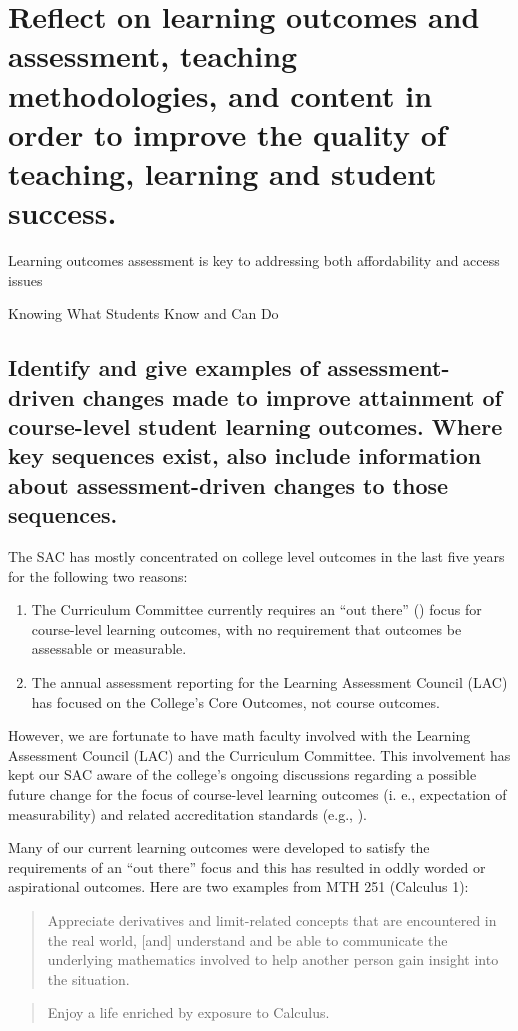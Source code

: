 \chapter[Outcomes and Assessment]{Reflect on learning outcomes and assessment,
  teaching methodologies, and content in order to improve the quality of teaching,
  learning and student success.}\label{chap:outcomes}
\epigraph{Learning outcomes assessment is key to addressing both affordability and access issues}
{Knowing What Students Know and Can Do \cite{outcomesquote}}

\section[Course-level outcomes]{Identify and give examples of assessment-driven
  changes made to improve attainment of course-level student learning outcomes.
  Where key sequences exist, also include information about assessment-driven changes to those sequences.
 }

The SAC has mostly concentrated on college level outcomes in the last five years for the following two reasons: \begin{enumerate} \item The Curriculum Committee currently requires an ``out there'' (\cite{courseoutcomes}) focus for course-level learning outcomes, with no requirement that outcomes be assessable or measurable.
	\item The annual assessment reporting for the Learning Assessment Council (LAC)
	      has focused on the College's Core Outcomes, not course outcomes.
\end{enumerate}

However, we are fortunate to have math faculty involved with the Learning Assessment Council (LAC) and the Curriculum Committee.
This involvement has kept our SAC aware of the college's ongoing discussions regarding a possible future change for the focus of course-level learning outcomes  (i.
e., expectation of
measurability) and related accreditation standards (e.g., \cite[Standard
	4.
	A.
	3]{NWCCU}).

Many of our current learning outcomes were developed to satisfy the requirements of an ``out there'' focus and this has resulted in oddly worded or aspirational outcomes.
Here are two examples from MTH 251 (Calculus 1):

\begin{quote} Appreciate derivatives and limit-related concepts that are encountered in the real world, [and] understand and be able to communicate the underlying mathematics involved to help another person gain insight into the situation.
\end{quote}
\begin{quote}
	Enjoy a life enriched by exposure to Calculus.
\end{quote}

